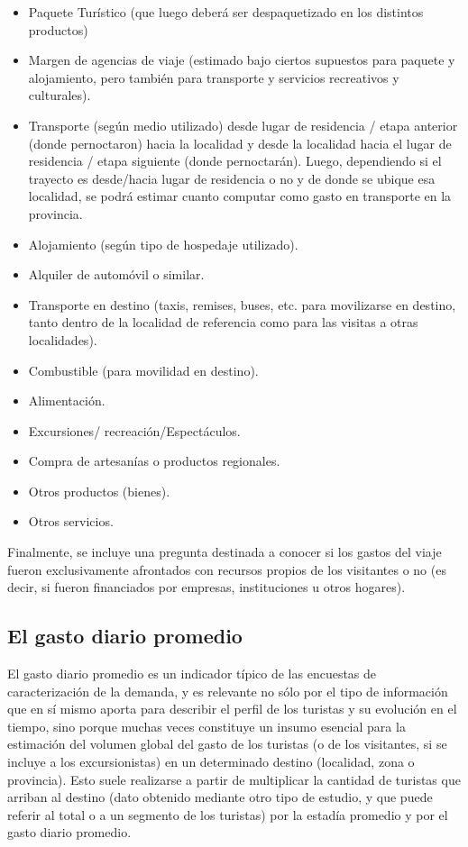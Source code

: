 \documentclass[
]{book}
\begin{document}
\begin{itemize}
\item
  Paquete Turístico (que luego deberá ser despaquetizado en los distintos productos)
\item
  Margen de agencias de viaje (estimado bajo ciertos supuestos para paquete y alojamiento, pero también para transporte y servicios recreativos y culturales).
\item
  Transporte (según medio utilizado) desde lugar de residencia / etapa anterior (donde pernoctaron) hacia la localidad y desde la localidad hacia el lugar de residencia / etapa siguiente (donde pernoctarán). Luego, dependiendo si el trayecto es desde/hacia lugar de residencia o no y de donde se ubique esa localidad, se podrá estimar cuanto computar como gasto en transporte en la provincia.
\item
  Alojamiento (según tipo de hospedaje utilizado).
\item
  Alquiler de automóvil o similar.
\item
  Transporte en destino (taxis, remises, buses, etc. para movilizarse en destino, tanto dentro de la localidad de referencia como para las visitas a otras localidades).
\item
  Combustible (para movilidad en destino).
\item
  Alimentación.
\item
  Excursiones/ recreación/Espectáculos.
\item
  Compra de artesanías o productos regionales.
\item
  Otros productos (bienes).
\item
  Otros servicios.
\end{itemize}

Finalmente, se incluye una pregunta destinada a conocer si los gastos del viaje fueron exclusivamente afrontados con recursos propios de los visitantes o no (es decir, si fueron financiados por empresas, instituciones u otros hogares).

\hypertarget{el-gasto-diario-promedio}{%
\subsection{El gasto diario promedio}\label{el-gasto-diario-promedio}}

El gasto diario promedio es un indicador típico de las encuestas de caracterización de la demanda, y es relevante no sólo por el tipo de información que en sí mismo aporta para describir el perfil de los turistas y su evolución en el tiempo, sino porque muchas veces constituye un insumo esencial para la estimación del volumen global del gasto de los turistas (o de los visitantes, si se incluye a los excursionistas) en un determinado destino (localidad, zona o provincia). Esto suele realizarse a partir de multiplicar la cantidad de turistas que arriban al destino (dato obtenido mediante otro tipo de estudio, y que puede referir al total o a un segmento de los turistas) por la estadía promedio y por el gasto diario promedio.
\end{document}
